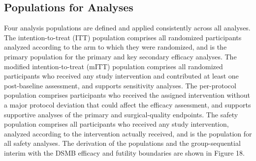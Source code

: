 \subsection{Populations for Analyses}

Four analysis populations are defined and applied consistently across all analyses.
The intention-to-treat (ITT) population comprises all randomized participants
analyzed according to the arm to which they were randomized, and is the primary
population for the primary and key secondary efficacy analyses. The modified
intention-to-treat (mITT) population comprises all randomized participants who
received any study intervention and contributed at least one post-baseline
assessment, and supports sensitivity analyses. The per-protocol population comprises
participants who received the assigned intervention without a major protocol deviation
that could affect the efficacy assessment, and supports supportive analyses of the
primary and surgical-quality endpoints. The safety population comprises all
participants who received any study intervention, analyzed according to the
intervention actually received, and is the population for all safety analyses. The
derivation of the populations and the group-sequential interim with the DSMB efficacy
and futility boundaries are shown in Figure 18.

